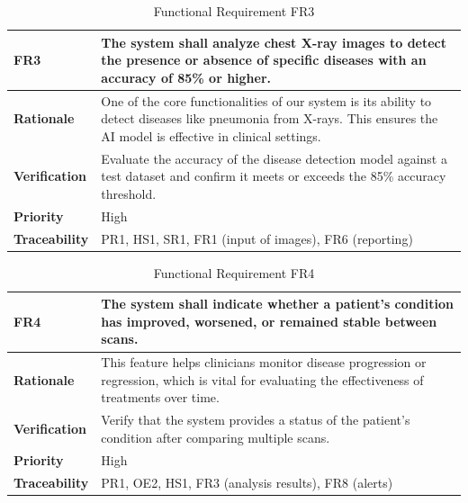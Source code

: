 \documentclass[12pt]{article}
\begin{document}
\begin{table}[h!]
\centering
{}
\begin{tabular}{|p{3.5cm}|p{11.5cm}|}
\hline
\rowcolor{gray!30}
\textbf{FR3} & The system shall analyze chest X-ray images to detect the presence or absence of specific diseases with an accuracy of 85\% or higher. \\
\hline
\textbf{Rationale} & One of the core functionalities of our system is its ability to detect diseases like pneumonia from X-rays. This ensures the AI model is effective in clinical settings. \\
\hline
\textbf{Verification} & Evaluate the accuracy of the disease detection model against a test dataset and confirm it meets or exceeds the 85\% accuracy threshold. \\
\hline
\textbf{Priority} & High \\
\hline
\textbf{Traceability} & PR1, HS1, SR1, FR1 (input of images), FR6 (reporting) \\
\hline
\end{tabular}
\caption{Functional Requirement FR3}
\end{table}
\begin{table}[h!]
\centering
{}
\begin{tabular}{|p{3.5cm}|p{11.5cm}|}
\hline
\rowcolor{gray!30}
\textbf{FR4} & The system shall indicate whether a patient's condition has improved, worsened, or remained stable between scans. \\
\hline
\textbf{Rationale} & This feature helps clinicians monitor disease progression or regression, which is vital for evaluating the effectiveness of treatments over time.\\
\hline
\textbf{Verification} & Verify that the system provides a status of the patient's condition after comparing multiple scans. \\
\hline
\textbf{Priority} & High \\
\hline
\textbf{Traceability} & PR1, OE2, HS1, FR3 (analysis results), FR8 (alerts) \\
\hline
\end{tabular}
\caption{Functional Requirement FR4}
\end{table}
\end{document}
